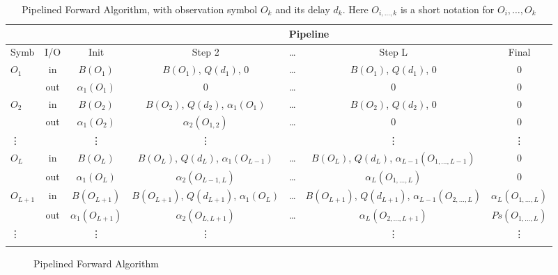 \documentclass[mscthesis]{usiinfthesis}
\begin{document}
\begin{table}
    \footnotesize
    \begin{center}
    \begin{tabular}{|l|*{6}{c|}}
    \cline{3-7}
    \multicolumn{2}{c|}{} & \multicolumn{5}{c|}{Pipeline}\\
    \hline
    Symb & I/O & Init & Step 2 & \dots & Step L & Final \\
    \hline
    \hline
    $O_1$ & in
        & $B(O_1)$ & $B(O_1)$, $Q(d_1)$, 0
        & \dots
        & $B(O_1)$, $Q(d_1)$, 0 & 0 \\
        & out
        & $\alpha_1(O_1)$ & 0
        & \dots
        & 0 & 0 \\
    \arrayrulecolor{mysmokegray}\hline
    $O_2$ & in
        & $B(O_2)$ & $B(O_2)$, $Q(d_2)$, $\alpha_1(O_1)$
        & \dots
        & $B(O_2)$, $Q(d_2)$, 0 & 0 \\
        & out
        & $\alpha_1(O_2)$ & $\alpha_2(O_{1,2})$
        & \dots
        & 0 & 0 \\
    \hline
    \vdots & & \vdots & \vdots & & \vdots & \vdots \\
    \hline
    $O_{L}$ & in
        & $B(O_L)$ & $B(O_L)$, $Q(d_L)$, $\alpha_1(O_{L-1})$
        & \dots
        & $B(O_L)$, $Q(d_L)$, $\alpha_{L-1}(O_{1,\dots,{L-1}})$ & 0 \\
        & out
        & $\alpha_1(O_L)$ & $\alpha_2(O_{{L-1},L})$
        & \dots
        & $\alpha_L(O_{1,\dots,L})$ & 0 \\
    \hline
    $O_{L+1}$ & in
        & $B(O_{L+1})$ & $B(O_{L+1})$, $Q(d_{L+1})$, $\alpha_1(O_L)$
        & \dots
        & $B(O_{L+1})$, $Q(d_{L+1})$, $\alpha_{L-1}(O_{2,\dots,L})$ & $\alpha_L(O_{1,\dots,L})$ \\
        & out
        & $\alpha_1(O_{L+1})$ & $\alpha_2(O_{L,{L+1}})$
        & \dots
        & $\alpha_L(O_{2,\dots,{L+1}})$ & $Ps(O_{1,\dots,L})$ \\
    \hline
    \vdots & & \vdots & \vdots & & \vdots & \vdots \\
    \arrayrulecolor{black}\hline
    \end{tabular}
    \end{center}
    \caption{Pipelined Forward Algorithm, with observation symbol $O_k$ and its
        delay $d_k$. Here $O_{i, \dots, k}$ is a short notation for $O_i, \dots,
        O_k$}
    \label{tab:pipeline}
\end{table}

\begin{figure}
    \centering
    
    \caption{Pipelined Forward Algorithm}
    \label{fig:pipeline}
\end{figure}
\end{document}
